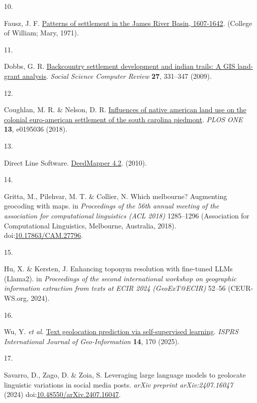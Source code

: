 \documentclass[
  10pt,
  twocolumn]{article}
\newlength{\cslhangindent}
\newlength{\csllabelwidth}
\newenvironment{CSLReferences}[2] %
 {\begin{list}{}{%
  \setlength{\itemindent}{0pt}
  \setlength{\leftmargin}{0pt}
  \setlength{\parsep}{0pt}
  \ifodd #1
   \setlength{\leftmargin}{\cslhangindent}
   \setlength{\itemindent}{-1\cslhangindent}
  \fi
  \setlength{\itemsep}{#2\baselineskip}}}
 {\end{list}}
\newcommand{\CSLLeftMargin}[1]{\parbox[t]{\csllabelwidth}{\strut#1\strut}}
\newcommand{\CSLRightInline}[1]{\parbox[t]{\linewidth - \csllabelwidth}{\strut#1\strut}}
\begin{document}
\begin{CSLReferences}{0}{0}
\CSLLeftMargin{10. }%
\CSLRightInline{Fausz, J. F.
\href{https://dx.doi.org/doi:10.21220/s2-jedw-z031}{Patterns of
settlement in the {James} {River} {Basin}, 1607-1642}. (College of
William; Mary, 1971).}

\CSLLeftMargin{11. }%
\CSLRightInline{Dobbs, G. R.
\href{https://doi.org/10.1177/0894439308329760}{Backcountry settlement
development and indian trails: A GIS land-grant analysis}. \emph{Social
Science Computer Review} \textbf{27}, 331--347 (2009).}

\CSLLeftMargin{12. }%
\CSLRightInline{Coughlan, M. R. \& Nelson, D. R.
\href{https://doi.org/10.1371/journal.pone.0195036}{Influences of native
american land use on the colonial euro-american settlement of the south
carolina piedmont}. \emph{PLOS ONE} \textbf{13}, e0195036 (2018).}

\CSLLeftMargin{13. }%
\CSLRightInline{Direct Line Software.
\href{https://directlinesoftware.com/deeds/}{DeedMapper 4.2}. (2010).}

\CSLLeftMargin{14. }%
\CSLRightInline{Gritta, M., Pilehvar, M. T. \& Collier, N. Which
melbourne? Augmenting geocoding with maps. in \emph{Proceedings of the
56th annual meeting of the association for computational linguistics
(ACL 2018)} 1285--1296 (Association for Computational Linguistics,
Melbourne, Australia, 2018).
doi:\href{https://doi.org/10.17863/CAM.27796}{10.17863/CAM.27796}.}

\CSLLeftMargin{15. }%
\CSLRightInline{Hu, X. \& Kersten, J. Enhancing toponym resolution with
fine-tuned {LLMs} ({Llama2}). in \emph{Proceedings of the second
international workshop on geographic information extraction from texts
at ECIR 2024 (GeoExT@ECIR)} 52--56 (CEUR-WS.org, 2024).}

\CSLLeftMargin{16. }%
\CSLRightInline{Wu, Y. \emph{et al.}
\href{https://doi.org/10.3390/ijgi14040170}{Text geolocation prediction
via self-supervised learning}. \emph{ISPRS International Journal of
Geo‐Information} \textbf{14}, 170 (2025).}

\CSLLeftMargin{17. }%
\CSLRightInline{Savarro, D., Zago, D. \& Zoia, S. Leveraging large
language models to geolocate linguistic variations in social media
posts. \emph{arXiv preprint arXiv:2407.16047} (2024)
doi:\href{https://doi.org/10.48550/arXiv.2407.16047}{10.48550/arXiv.2407.16047}.}


\end{CSLReferences}
\end{document}
